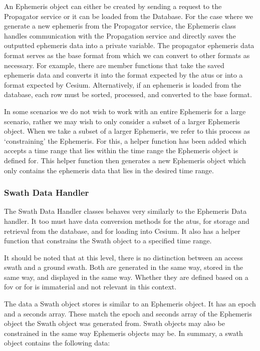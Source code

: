 An Ephemeris object can either be created by sending a request to the
Propagator service or it can be loaded from the Database. For the case where we
generate a new ephemeris from the Propagator service, the Ephemeris class
handles communication with the Propagation service and directly saves the
outputted ephemeris data into a private variable. The propagator ephemeris data
format serves as the base format from which we can convert to other formats as
necessary. For example, there are member functions that take the saved
ephemeris data and converts it into the format expected by the \glspl{atu} or
into a format expected by Cesium. Alternatively, if an ephemeris is loaded from
the database, each row must be sorted, processed, and converted to the base
format. 

In some scenarios we do not wish to work with an entire Ephemeris for a large
scenario, rather we may wish to only consider a subset of a larger Ephemeris
object. When we take a subset of a larger Ephemeris, we refer to this process
as `constraining' the Ephemeris. For this, a helper function has been added
which accepts a time range that lies within the time range the Ephemeris object
is defined for. This helper function then generates a new Ephemeris object
which only contains the ephemeris data that lies in the desired time range.  

\subsubsection{Swath Data Handler}

The Swath Data Handler classes behaves very similarly to the Ephemeris Data
handler. It too must have data conversion methods for the \glspl{atu}, for
storage and retrieval from the database, and for loading into Cesium. It also
has a helper function that constrains the Swath object to a specified time
range. 

It should be noted that at this level, there is no distinction between an
access swath and a ground swath. Both are generated in the same way, stored in
the same way, and displayed in the same way. Whether they are defined based on
a \gls{fov} or \gls{for} is immaterial and not relevant in this context. 

The data a Swath object stores is similar to an Ephemeris object. It has an
epoch and a seconds array. These match the epoch and seconds array of the
Ephemeris object the Swath object was generated from. Swath objects may also be
constrained in the same way Ephemeris objects may be. In summary, a swath
object contains the following data:

